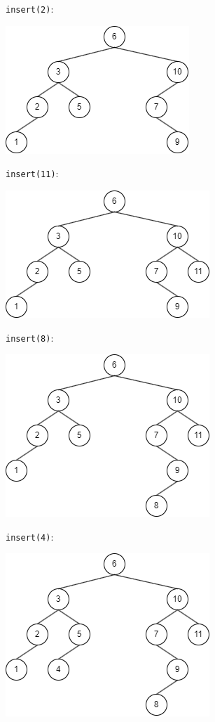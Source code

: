 \begin{solution}
\lstinline{insert(2)}:

\includegraphics[scale=0.75]{topics/trees/binary-search-trees/medium/bst-insertion-removal-images/insert2.png}

\lstinline{insert(11)}:

\includegraphics[scale=0.75]{topics/trees/binary-search-trees/medium/bst-insertion-removal-images/insert11.png}

\lstinline{insert(8)}:

\includegraphics[scale=0.75]{topics/trees/binary-search-trees/medium/bst-insertion-removal-images/insert8.png}

\lstinline{insert(4)}:

\includegraphics[scale=0.75]{topics/trees/binary-search-trees/medium/bst-insertion-removal-images/insert4.png}


\end{solution}
